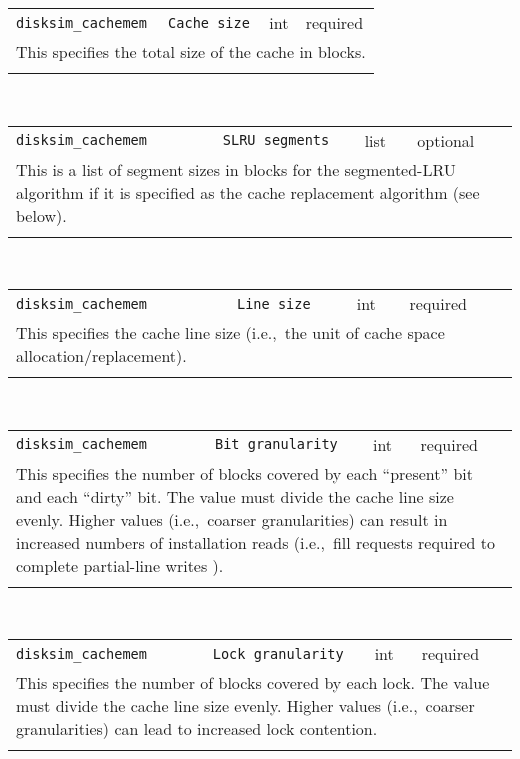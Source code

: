 \noindent 
\begin{tabular}{|p{1.5in}|p{3.5in}|p{0.5in}|p{0.5in}|}
\cline{1-4}
\texttt{disksim\_cachemem} & \texttt{Cache size} & int & required \\ 
\cline{1-4}
\multicolumn{4}{|p{6in}|}{
This specifies the total size of the cache in blocks.
}\\ 
\cline{1-4}
\multicolumn{4}{p{5in}}{}\\
\end{tabular}\\ 
\noindent 
\begin{tabular}{|p{1.5in}|p{3.5in}|p{0.5in}|p{0.5in}|}
\cline{1-4}
\texttt{disksim\_cachemem} & \texttt{SLRU segments} & list & optional \\ 
\cline{1-4}
\multicolumn{4}{|p{6in}|}{
This is a list of segment sizes in blocks for the segmented-LRU algorithm
\cite{Karedla94} if it is specified as the cache replacement algorithm
(see below).
}\\ 
\cline{1-4}
\multicolumn{4}{p{5in}}{}\\
\end{tabular}\\ 
\noindent 
\begin{tabular}{|p{1.5in}|p{3.5in}|p{0.5in}|p{0.5in}|}
\cline{1-4}
\texttt{disksim\_cachemem} & \texttt{Line size} & int & required \\ 
\cline{1-4}
\multicolumn{4}{|p{6in}|}{
This specifies the cache line size (i.e.,~the unit of cache space
allocation/replacement).
}\\ 
\cline{1-4}
\multicolumn{4}{p{5in}}{}\\
\end{tabular}\\ 
\noindent 
\begin{tabular}{|p{1.5in}|p{3.5in}|p{0.5in}|p{0.5in}|}
\cline{1-4}
\texttt{disksim\_cachemem} & \texttt{Bit granularity} & int & required \\ 
\cline{1-4}
\multicolumn{4}{|p{6in}|}{
This specifies the number of blocks covered by each ``present'' bit and
each ``dirty'' bit. The value must divide the cache line size evenly.
Higher values (i.e.,~coarser granularities) can result in increased
numbers of installation reads (i.e.,~fill requests required to
complete partial-line writes \cite{Otoole94}).
}\\ 
\cline{1-4}
\multicolumn{4}{p{5in}}{}\\
\end{tabular}\\ 
\noindent 
\begin{tabular}{|p{1.5in}|p{3.5in}|p{0.5in}|p{0.5in}|}
\cline{1-4}
\texttt{disksim\_cachemem} & \texttt{Lock granularity} & int & required \\ 
\cline{1-4}
\multicolumn{4}{|p{6in}|}{
This specifies the number of blocks covered by each lock. The value must
divide the cache line size evenly. Higher values (i.e.,~coarser
granularities) can lead to increased lock contention.
}\\ 
\cline{1-4}
\multicolumn{4}{p{5in}}{}\\
\end{tabular}\\ 
